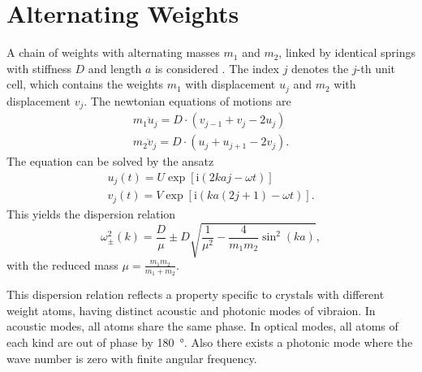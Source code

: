 \section{Alternating Weights}
A chain of weights with alternating masses $m_1$ and $m_2$, linked by identical springs with stiffness $D$ and length $a$ is considered .
The index $j$ denotes the $j$-th unit cell, which contains the weights $m_1$ with displacement $u_j$ and $m_2$ with displacement $v_j$.
The newtonian equations of motions are
\begin{gather*}
	m_1 \ddot u_j = D \cdot \left(v_{j - 1} + v_{j} - 2 u_j \right)\\
	m_2 \ddot v_j = D \cdot \left(u_{j} + u_{j + 1} - 2 v_j \right).
\end{gather*}
The equation can be solved by the ansatz
\begin{gather*}
	u_j(t) = U \exp\left[\text{i} \left(2 k a j - \omega t\right)\right]\\
	v_j(t) = V \exp\left[\text{i} \left(k a (2 j + 1) - \omega t\right)\right].
\end{gather*}
This yields the dispersion relation
\begin{equation}
	\omega_\pm^2(k) = \frac{D}{\mu} \pm D\sqrt{\frac{1}{\mu^2} - \frac{4}{m_1 m_2}\sin^2\left(k a\right)},
\end{equation}
with the reduced mass $\mu = \frac{m_1 m_2}{m_1 + m_2}$.

This dispersion relation reflects a property specific to crystals with different weight atoms, having distinct acoustic and photonic modes of vibraion.
In acoustic modes, all atoms share the same phase.
In optical modes, all atoms of each kind are out of phase by \SI{180}{\degree}.
Also there exists a photonic mode where the wave number is zero with finite angular frequency.
